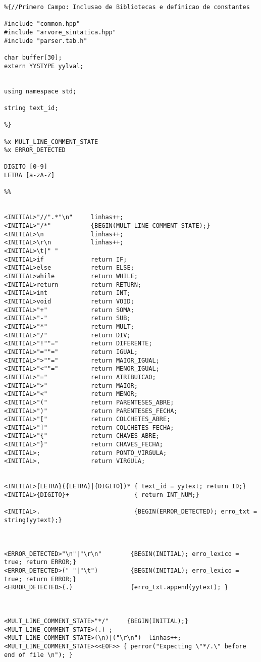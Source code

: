 \begin{lstlisting}
%{//Primero Campo: Inclusao de Bibliotecas e definicao de constantes

#include "common.hpp"
#include "arvore_sintatica.hpp"
#include "parser.tab.h"

char buffer[30];
extern YYSTYPE yylval;


using namespace std;

string text_id;

%}

%x MULT_LINE_COMMENT_STATE
%x ERROR_DETECTED

DIGITO [0-9]
LETRA [a-zA-Z]

%%


<INITIAL>"//".*"\n"		linhas++;
<INITIAL>"/*"  			{BEGIN(MULT_LINE_COMMENT_STATE);}
<INITIAL>\n				linhas++;
<INITIAL>\r\n			linhas++;
<INITIAL>\t|" "
<INITIAL>if             return IF;
<INITIAL>else			return ELSE;
<INITIAL>while			return WHILE;
<INITIAL>return			return RETURN;
<INITIAL>int			return INT;
<INITIAL>void			return VOID;
<INITIAL>"+"			return SOMA;
<INITIAL>"-"			return SUB;
<INITIAL>"*"			return MULT;
<INITIAL>"/"			return DIV;
<INITIAL>"!""="         return DIFERENTE;
<INITIAL>"=""="			return IGUAL;
<INITIAL>">""="			return MAIOR_IGUAL;
<INITIAL>"<""="			return MENOR_IGUAL;
<INITIAL>"="			return ATRIBUICAO;
<INITIAL>">"			return MAIOR;
<INITIAL>"<"			return MENOR;
<INITIAL>"("			return PARENTESES_ABRE;
<INITIAL>")"			return PARENTESES_FECHA;
<INITIAL>"["			return COLCHETES_ABRE;
<INITIAL>"]"			return COLCHETES_FECHA;
<INITIAL>"{"			return CHAVES_ABRE;
<INITIAL>"}"			return CHAVES_FECHA;
<INITIAL>;              return PONTO_VIRGULA;
<INITIAL>,              return VIRGULA;


<INITIAL>{LETRA}({LETRA}|{DIGITO})*	{ text_id = yytext; return ID;}
<INITIAL>{DIGITO}+					{ return INT_NUM;}

<INITIAL>.                          {BEGIN(ERROR_DETECTED); erro_txt = string(yytext);}



<ERROR_DETECTED>"\n"|"\r\n"        {BEGIN(INITIAL); erro_lexico = true; return ERROR;}
<ERROR_DETECTED>(" "|"\t")         {BEGIN(INITIAL); erro_lexico = true; return ERROR;}
<ERROR_DETECTED>(.)                {erro_txt.append(yytext); }



<MULT_LINE_COMMENT_STATE>"*/"     {BEGIN(INITIAL);}
<MULT_LINE_COMMENT_STATE>(.) ;
<MULT_LINE_COMMENT_STATE>(\n)|("\r\n")  linhas++;
<MULT_LINE_COMMENT_STATE><<EOF>> { perror("Expecting \"*/.\" before end of file \n"); }




\end{lstlisting}
